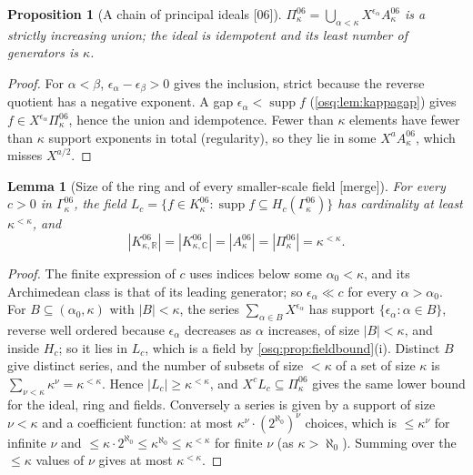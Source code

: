\documentclass[11pt,letterpaper]{article}
\numberwithin{equation}{section}
\newtheorem{lemma}[lemma]{Lemma}
\newtheorem{proposition}[proposition]{Proposition}
\theoremstyle{definition}
\theoremstyle{remark}
\theoremstyle{plain}
\newcommand{\R}{\mathbb R}
\newcommand{\C}{\mathbb C}
\newcommand{\supp}{\operatorname{supp}}
\newcommand{\src}[1]{\textup{\textsf{[#1]}}}
\newcommand{\merge}{\textup{\textsf{[merge]}}}
\begin{document}
\begin{proposition}[A chain of principal ideals \src{06}]\label{osq:prop:kappachain}
$\Pi^{06}_\kappa=\bigcup_{\alpha<\kappa}X^{\epsilon_\alpha}A^{06}_\kappa$ is a strictly increasing union;
the ideal is idempotent and its least number of generators is $\kappa$.
\end{proposition}
\begin{proof}
For $\alpha<\beta$, $\epsilon_\alpha-\epsilon_\beta>0$ gives the inclusion, strict because the reverse
quotient has a negative exponent. A gap $\epsilon_\alpha<\supp f$ (\cref{osq:lem:kappagap}) gives
$f\in X^{\epsilon_\alpha}\Pi^{06}_\kappa$, hence the union and idempotence. Fewer than $\kappa$ elements
have fewer than $\kappa$ support exponents in total (regularity), so they lie in some $X^aA^{06}_\kappa$,
which misses $X^{a/2}$.
\end{proof}

\begin{lemma}[Size of the ring and of every smaller-scale field \merge]\label{osq:lem:card06}
For every $c>0$ in $\Gamma^{06}_\kappa$, the field $L_c=\{f\in K^{06}_\kappa:\supp f\subseteq
H_c(\Gamma^{06}_\kappa)\}$ has cardinality at least $\kappa^{<\kappa}$, and
\[
 |K^{06}_{\kappa,\R}|=|K^{06}_{\kappa,\C}|=|A^{06}_\kappa|=|\Pi^{06}_\kappa|=\kappa^{<\kappa}.
\]
\end{lemma}
\begin{proof}
The finite expression of $c$ uses indices below some $\alpha_0<\kappa$, and its Archimedean class is
that of its leading generator; so $\epsilon_\alpha\ll c$ for every $\alpha>\alpha_0$. For
$B\subseteq(\alpha_0,\kappa)$ with $|B|<\kappa$, the series $\sum_{\alpha\in B}X^{\epsilon_\alpha}$ has
support $\{\epsilon_\alpha:\alpha\in B\}$, reverse well ordered because $\epsilon_\alpha$ decreases as
$\alpha$ increases, of size $|B|<\kappa$, and inside $H_c$; so it lies in $L_c$, which is a field by
\cref{osq:prop:fieldbound}(i). Distinct $B$ give distinct series, and the number of subsets of size
$<\kappa$ of a set of size $\kappa$ is $\sum_{\nu<\kappa}\kappa^{\nu}=\kappa^{<\kappa}$. Hence
$|L_c|\ge\kappa^{<\kappa}$, and $X^cL_c\subseteq\Pi^{06}_\kappa$ gives the same lower bound for the ideal,
ring and fields. Conversely a series is given by a support of size $\nu<\kappa$ and a coefficient function:
at most $\kappa^\nu\cdot(2^{\aleph_0})^\nu$ choices, which is $\le\kappa^\nu$ for infinite $\nu$ and
$\le\kappa\cdot2^{\aleph_0}\le\kappa^{\aleph_0}\le\kappa^{<\kappa}$ for finite $\nu$ (as $\kappa>\aleph_0$). Summing over
the $\le\kappa$ values of $\nu$ gives at most $\kappa^{<\kappa}$.
\end{proof}
\end{document}
